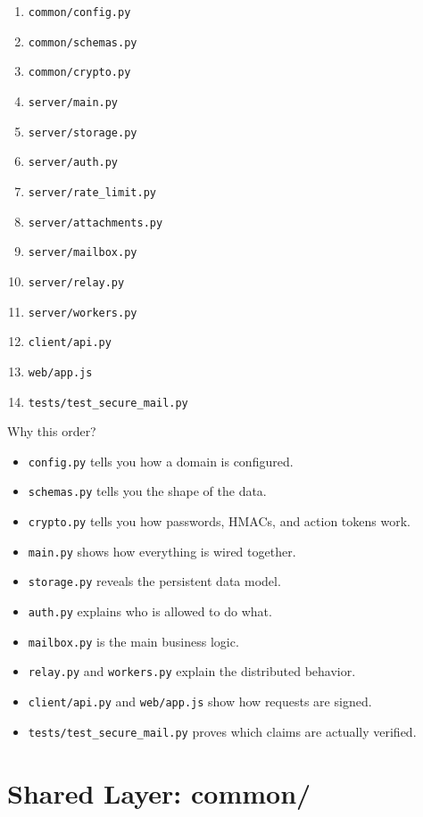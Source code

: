 \documentclass[11pt,a4paper]{article}
\begin{document}
\begin{enumerate}
\item \nolinkurl{common/config.py}
\item \nolinkurl{common/schemas.py}
\item \nolinkurl{common/crypto.py}
\item \nolinkurl{server/main.py}
\item \nolinkurl{server/storage.py}
\item \nolinkurl{server/auth.py}
\item \nolinkurl{server/rate_limit.py}
\item \nolinkurl{server/attachments.py}
\item \nolinkurl{server/mailbox.py}
\item \nolinkurl{server/relay.py}
\item \nolinkurl{server/workers.py}
\item \nolinkurl{client/api.py}
\item \nolinkurl{web/app.js}
\item \nolinkurl{tests/test_secure_mail.py}
\end{enumerate}

Why this order?

\begin{itemize}
\item \nolinkurl{config.py} tells you how a domain is configured.
\item \nolinkurl{schemas.py} tells you the shape of the data.
\item \nolinkurl{crypto.py} tells you how passwords, HMACs, and action tokens work.
\item \nolinkurl{main.py} shows how everything is wired together.
\item \nolinkurl{storage.py} reveals the persistent data model.
\item \nolinkurl{auth.py} explains who is allowed to do what.
\item \nolinkurl{mailbox.py} is the main business logic.
\item \nolinkurl{relay.py} and \nolinkurl{workers.py} explain the distributed behavior.
\item \nolinkurl{client/api.py} and \nolinkurl{web/app.js} show how requests are signed.
\item \nolinkurl{tests/test_secure_mail.py} proves which claims are actually verified.
\end{itemize}


\section{Shared Layer: common/}
\end{document}
